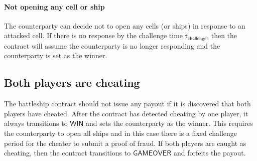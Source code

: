 \documentclass{llncs}
\newcommand{\gamewinner}{\mathsf{WIN}}
\newcommand{\gamefinished}{\mathsf{GAMEOVER}}
\newcommand{\timechallenge}{\mathsf{t}_{\mathsf{challenge}}}
\begin{document}
\paragraph{Not opening any cell or ship}
The counterparty can decide not to open any cells (or ships) in response to an attacked cell. If there is no response by the challenge time $\timechallenge$, then the contract will assume the counterparty is no longer responding and the counterparty is set as the winner. 

\subsection{Both players are cheating} 

The battleship contract should not issue any payout if it is discovered that both players have cheated. 
After the contract has detected cheating by one player, it always transitions to $\gamewinner$ and sets the counterparty as the winner.
This requires the counterparty to open all ships and in this case there is a fixed challenge period for the cheater to submit a proof of fraud.
If both players are caught as cheating, then the contract transitions to $\gamefinished$ and forfeits the payout. 
\end{document}
